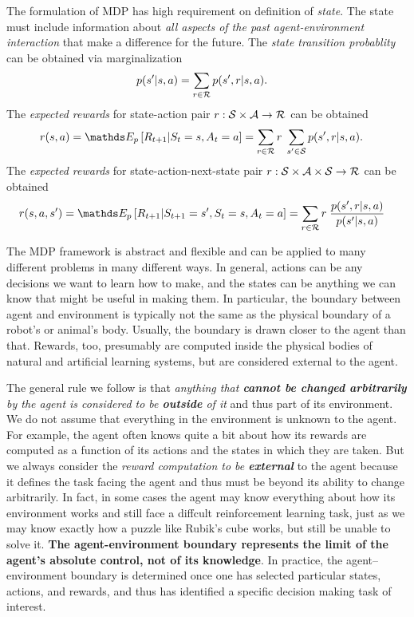 \documentclass[11pt]{article}
\begin{document}
The formulation of MDP has high requirement on definition of {\emph{state}}. The state must include information about \emph{all aspects of the past agent-environment interaction} that make a difference for the future. The \emph{state transition probablity} can be obtained via marginalization
\begin{align*}
p(s' | s, a) &= \sum_{r\in {\mathcal R}}p(s', r | s, a).
\end{align*} The \emph{expected rewards} for state-action pair $r: {\mathcal S} \times {\mathcal A} \rightarrow {\mathcal R}$ can be obtained 
\begin{align}
r(s,a) &= \E{p}{R_{t+1}|S_{t}=s, A_{t}=a} = \sum_{r\in \cR}r \;\sum_{s'\in \cS}p(s', r| s, a). \label{eqn: expected_rewards_state_action}
\end{align}The \emph{expected rewards} for state-action-next-state pair $r: {\mathcal S} \times {\mathcal A} \times {\mathcal S} \rightarrow {\mathcal R}$ can be obtained 
\begin{align*}
r(s,a, s') &= \E{p}{R_{t+1}|S_{t+1}=s', S_{t}=s, A_{t}=a} = \sum_{r\in \cR}r \;\frac{p(s', r| s, a)}{p(s' | s, a)}
\end{align*}

The MDP framework is abstract and flexible and can be applied to many different problems in many different ways. In general, actions can be any decisions we want to learn how to make, and the states can be anything we can know that might be useful in making them. In particular, the boundary between agent and environment is typically not the same as the physical boundary of a robot’s or animal’s body. Usually, the boundary is drawn closer to the agent than that. Rewards, too, presumably are computed inside the physical bodies of natural and artificial learning systems, but are considered external to the agent.

The general rule we follow is that \emph{anything that \textbf{cannot be changed arbitrarily} by the agent is considered to be \textbf{outside} of it} and thus part of its environment. We do not assume that everything in the environment is unknown to the agent. For example, the agent often knows quite a bit about how its rewards are computed as a function of its actions and the states in which they are taken. But we always consider the\emph{ reward computation to be \textbf{external}} to the agent because it defines the task facing the agent and thus must be beyond its ability to change arbitrarily. In fact, in some cases the agent may know everything about how its environment works and still face a diffcult reinforcement learning task, just as we may know exactly how a puzzle like Rubik’s cube works, but still be unable to solve it. \textbf{The agent-environment boundary represents the limit of the agent’s absolute control, not of its knowledge}. In practice, the agent–environment boundary is determined once one has selected particular states, actions, and rewards, and thus has identified a specific decision making task of interest.
\end{document}
